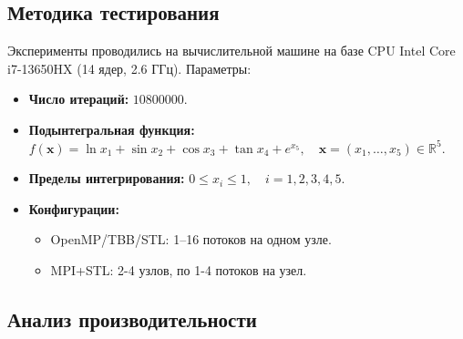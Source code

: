 \documentclass[a4paper,12pt]{article}
\begin{document}
\subsection{Методика тестирования}
Эксперименты проводились на вычислительной машине на базе CPU Intel Core i7-13650HX (14 ядер, 2.6 ГГц). Параметры:
\begin{itemize}
\item \textbf{Число итераций:} \(10 800 000\).
\item \textbf{Подынтегральная функция:} $f(\mathbf{x}) = \ln x_1 + \sin x_2 + \cos x_3 + \tan x_4 + e^{x_5}, \quad \mathbf{x} = (x_1, \dots, x_5) \in \mathbb{R}^5$.
\item \textbf{Пределы интегрирования:} $0 \leq x_i \leq 1, \quad i = 1, 2, 3, 4, 5$.
\item \textbf{Конфигурации:} 
\begin{itemize}
\item OpenMP/TBB/STL: 1–16 потоков на одном узле.
\item MPI+STL: 2-4 узлов, по 1-4 потоков на узел.
\end{itemize}
\end{itemize}

\subsection{Анализ производительности}
\end{document}
